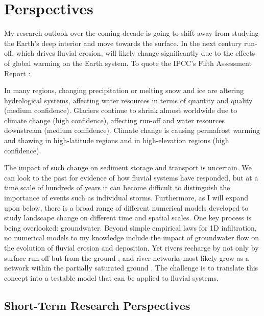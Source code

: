 \chapter{Perspectives}

My research outlook over the coming decade is going to shift away from studying the Earth's deep interior and move towards the surface. In the next century run-off, which drives fluvial erosion, will likely change significantly due to the effects of global warming on the Earth system. To quote the IPCC's Fifth Assessment Report \cite{IPCC-policy-2014}:

\begin{displayquote}
In many regions, changing precipitation or melting snow and ice are altering hydrological systems, affecting water resources in terms of quantity and quality (medium confidence). Glaciers continue to shrink almost worldwide due to climate change (high confidence), affecting run-off and water resources downstream (medium confidence). Climate change is causing permafrost warming and thawing in high-latitude regions and in high-elevation regions (high confidence).
\end{displayquote}

The impact of such change on sediment storage and transport is uncertain. We can look to the past for evidence of how fluvial systems have responded, but at a time scale of hundreds of years it can become difficult to distinguish the importance of events such as individual storms. Furthermore, as I will expand upon below, there is a broad range of different numerical models developed to study landscape change on different time and spatial scales. One key process is being overlooked: groundwater. Beyond simple empirical laws for 1D infiltration, no numerical models to my knowledge include the impact of groundwater flow on the evolution of fluvial erosion and deposition. Yet rivers recharge by not only by surface run-off but from the ground \citep[e.g.][]{condon-etal-2020}, and river networks most likely grow as a network within the partially saturated ground \citep[e.g.][]{devauchelle-etal-2012}. The challenge is to translate this concept into a testable model that can be applied to fluvial systems.

\section{Short-Term Research Perspectives}

